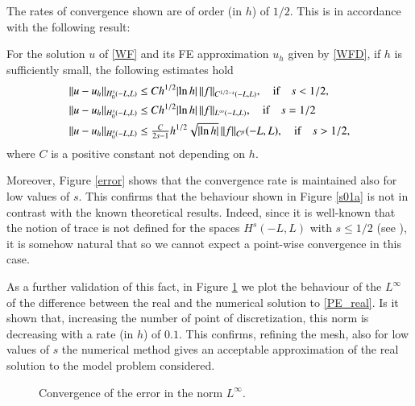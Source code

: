 The rates of convergence shown are of order (in $h$) of $1/2$. This is in accordance with the following result: 
%
\begin{theorem}
%
For the solution $u$ of \eqref{WF} and its FE approximation $u_h$ given by \eqref{WFD}, if $h$ is sufficiently small, the following estimates hold
%
\begin{align*}
&\|u-u_h\|_{H^s_0(-L,L)}\leq C h^{1/2}|\!\ln h|\,\|f\|_{C^{1/2-s}(-L,L)}, \quad \textnormal{if}\quad s<1/2, \\
&\|u-u_h\|_{H^s_0(-L,L)}\leq C h^{1/2} |\!\ln h|\, \|f\|_{L^\infty(-L,L)}, \quad \textnormal{if}\quad  s=1/2 \\
&\|u-u_h\|_{H^s_0(-L,L)}\leq \tfrac{C}{2s-1} h^{1/2} \sqrt{|\!\ln h|}\, \|f\|_{C^\beta}(-L,L), \quad \textnormal{if} \quad s>1/2,
\end{align*}
where $C$ is a positive constant not depending on $h$. 
\end{theorem}

Moreover, Figure \ref{error} shows that the convergence rate is maintained also for low values of $s$. This confirms that the behaviour shown in Figure \ref{s01a} is not in contrast with the known theoretical results. Indeed, since it is well-known that the notion of trace is not defined for the spaces $H^s(-L,L)$ with $s\leq 1/2$ (see \cite{lions1968problemes,tartar2007introduction}), it is somehow natural that so we cannot expect a point-wise convergence in this case.  

As a further validation of this fact, in Figure \ref{linfty_error} we plot the behaviour of the $L^{\infty}$ of the difference between the real and the numerical solution to \eqref{PE_real}. Is it shown that, increasing the number of point of discretization, this norm is decreasing with a rate (in $h$) of $0.1$. This confirms, refining the mesh, also for low values of $s$ the numerical method gives an acceptable approximation of the real solution to the model problem considered.   

\begin{figure}[!h]
\centering

\caption{Convergence of the error in the norm $L^\infty$.}\label{linfty_error}
\end{figure}

